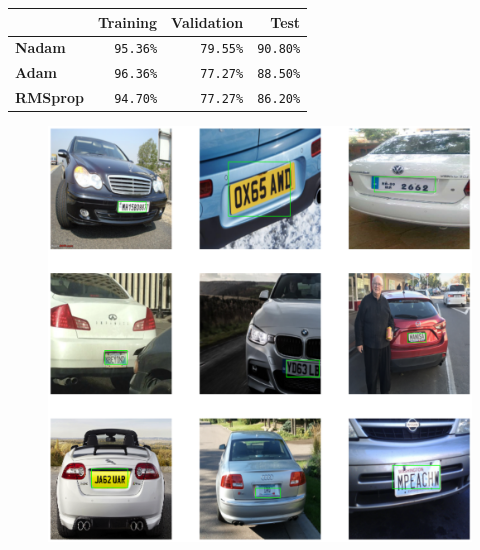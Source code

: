 	
	\begin{table}[H]
		\centering
		\begin{tabular}{l|r|r|r}
			\hline
			 & \textbf{Training} & \textbf{Validation} & \textbf{Test} \\
			
			\hline
			\textbf{Nadam} &
			\texttt{95.36\%} &
			\texttt{79.55\%} &
			\texttt{90.80\%} \\
			\hline
			\textbf{Adam} &
			\texttt{96.36\%} &
			\texttt{77.27\%} &
			\texttt{88.50\%} \\
			\hline
			\textbf{RMSprop} &
			\texttt{94.70\%} &
			\texttt{77.27\%} &
			\texttt{86.20\%} \\
			\hline
			
		\end{tabular}
	\end{table}
	
	
	
	


	\begin{figure}[H]%
		\centering
		\includegraphics[width=\textwidth]{images/predicted_trans_image}
		\caption{}
		\label{fig:predicted_trans_image}
	\end{figure}
	
